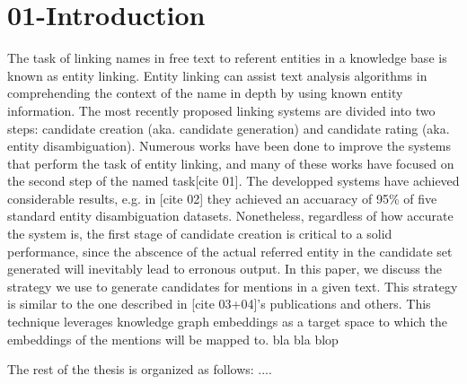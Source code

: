 \chapter{01-Introduction}
\label{ch:introduction}


The task of linking names in free text to referent entities in a knowledge base is known as entity linking. Entity linking can assist text analysis algorithms in comprehending the context of the name in depth by using known entity information. The most recently proposed linking systems are divided into two steps: candidate creation (aka. candidate generation) and candidate rating (aka. entity disambiguation).\newline
Numerous works have been done to improve the systems that perform the task of entity linking, and many of these works have focused on the second step of the named task[cite 01]. The 
developped systems have achieved considerable results, e.g. in [cite 02] they achieved an accuaracy of 95\% of five standard entity disambiguation datasets.\newline
Nonetheless, regardless of how accurate the system is, the first stage of candidate creation is critical to a solid performance, since the abscence of the actual referred entity in the candidate set generated will inevitably lead to erronous output.\newline
In this paper, we discuss the strategy we use to generate candidates for mentions in a given text. This strategy is similar to the one described in [cite 03+04]'s publications and others. This technique leverages knowledge graph embeddings as a target space to which the embeddings of the mentions will be mapped to. \newline
bla \newline
bla \newline
blop \newline

The rest of the thesis is organized as follows: ....
